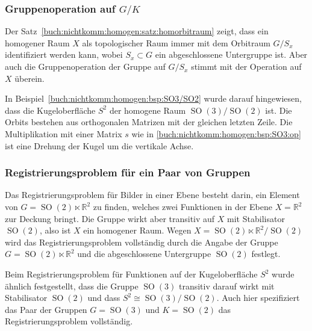 %
%
\subsubsection{Gruppenoperation auf $G/K$
\label{buch:nichtkomm:homogen:subsection:opaufgk}}
Der Satz~\ref{buch:nichtkomm:homogen:satz:homorbitraum} zeigt, dass
ein homogener Raum $X$ als topologischer Raum immer mit dem Orbitraum
$G/S_x$ identifiziert werden kann, wobei $S_x\subset G$ ein abgeschlossene
Untergruppe ist.
Aber auch die Gruppenoperation der Gruppe auf $G/S_x$ stimmt mit der
Operation auf $X$ überein.

\begin{beispiel}
In Beispiel~\ref{buch:nichtkomm:homogen:bsp:SO3/SO2} wurde darauf
hingewiesen, dass die Kugeloberfläche $S^2$ der homogene Raum
$\operatorname{SO}(3)/\operatorname{SO}(2)$ ist.
Die Orbits bestehen aus orthogonalen Matrizen mit der gleichen letzten
Zeile.
Die Multiplikation mit einer Matrix $s$ wie in 
\eqref{buch:nichtkomm:homogen:bsp:SO3:op}
ist eine Drehung der Kugel um die vertikale Achse.
\end{beispiel}

%
%
\subsubsection{Registrierungsproblem für ein Paar von Gruppen}
Das Registrierungsproblem für Bilder in einer Ebene besteht
darin, ein Element von $G=\operatorname{SO}(2)\ltimes \mathbb{R}^2$
zu finden, welches zwei Funktionen in der Ebene $X=\mathbb{R}^2$
zur Deckung bringt.
Die Gruppe wirkt aber transitiv auf $X$ mit Stabilisator
$\operatorname{SO}(2)$, also ist $X$ ein homogener Raum.
Wegen $X=\operatorname{SO}(2)\ltimes\mathbb{R}^2/\operatorname{SO}(2)$
wird das Registrierungsproblem vollständig durch die Angabe
der Gruppe $G=\operatorname{SO}(2)\ltimes \mathbb{R}^2$ und
die abgeschlossene Untergruppe $\operatorname{SO}(2)$ festlegt.

Beim Registrierungsproblem für Funktionen auf der Kugeloberfläche
$S^2$ wurde ähnlich festgestellt, dass die Gruppe $\operatorname{SO}(3)$
transitiv darauf wirkt mit Stabilisator $\operatorname{SO}(2)$ und
dass $S^2\cong \operatorname{SO}(3)/\operatorname{SO}(2)$.
Auch hier spezifiziert das Paar der Gruppen $G=\operatorname{SO}(3)$
und $K=\operatorname{SO}(2)$ das Registrierungsproblem vollständig.



